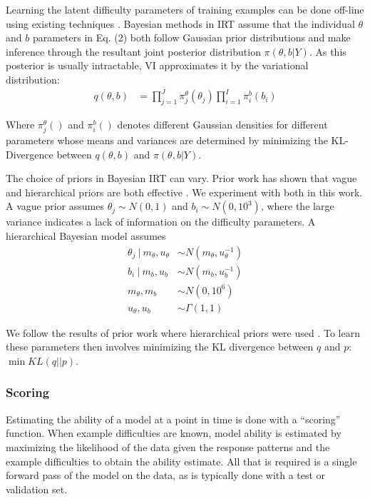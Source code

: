 \documentclass[letterpaper]{article} %
\begin{document}
Learning the latent difficulty parameters of training examples can be done off-line using existing techniques \cite{natesan_bayesian_2016,lalor_learning_2019}.
Bayesian methods in IRT assume that the individual $\theta$ and $b$ parameters in Eq. (2) both follow Gaussian prior distributions and make inference through the resultant joint posterior distribution $\pi(\theta,b|Y)$. As this posterior is usually intractable, VI approximates it by the variational distribution:
\begin{align} 
q(\theta, b) &=  \prod_{j=1}^J \pi^\theta_j(\theta_j) \prod_{i=1}^I \pi^b_i(b_i)
\end{align} 

Where $\pi^\theta_j()$ and $\pi^b_i()$ denotes different Gaussian densities for different parameters whose means and variances are determined by minimizing the KL-Divergence between $q(\theta,b)$ and $\pi(\theta,b|Y)$.

The choice of priors in Bayesian IRT can vary.
Prior work has shown that vague and hierarchical priors are both effective \cite{natesan_bayesian_2016}.
We experiment with both in this work. A vague prior assumes $\theta_j \sim N(0, 1)$ and $b_i \sim N(0, 10^3)$, where the large variance indicates a lack of information on the difficulty parameters.
A hierarchical Bayesian model assumes
\begin{align*}
\theta_j\ |\ m_\theta, u_\theta &\sim N(m_{\theta}, u^{-1}_{\theta}) \\
b_i\ |\ m_b, u_b &\sim N(m_b, u^{-1}_b) \\
m_{\theta}, m_{b} &\sim N(0, 10^6) \\
u_{\theta}, u_b &\sim \Gamma(1, 1)
\end{align*}

We follow the results of prior work where hierarchical priors were used \cite{lalor_learning_2019}.
To learn these parameters then involves minimizing the KL divergence between $q$ and $p$: $\min KL(q \vert \vert p)$. 


\subsubsection{Scoring}
\label{ssec:scoring}
Estimating the ability of a model at a point in time is done with a ``scoring'' function. 
When example difficulties are known, model ability is estimated by maximizing the likelihood of the data given the response patterns and the example difficulties to obtain the ability estimate.
All that is required is a single forward pass of the model on the data, as is typically done with a test or validation set. 
\end{document}
